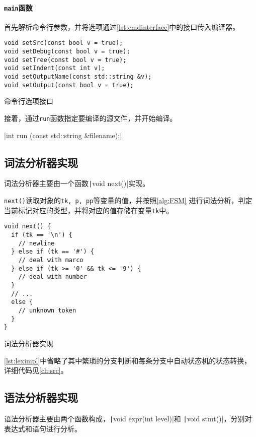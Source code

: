 \paragraph{{\tt main}函数}

首先解析命令行参数，并将选项通过\autoref{lst:cmdinterface}中的接口传入编译器。

\begin{listing}[htb]
\begin{verbatim}
void setSrc(const bool v = true);
void setDebug(const bool v = true);
void setTree(const bool v = true);
void setIndent(const int v);
void setOutputName(const std::string &v);
void setOutput(const bool v = true);
\end{verbatim}
\caption{命令行选项接口}\label{lst:cmdinterface}
\end{listing}

接着，通过{\tt run}函数指定要编译的源文件，并开始编译。

|int run (const std::string &filename);|

\subsection{词法分析器实现}

词法分析器主要由一个函数\texttt|void next()|实现。


{\tt next()}读取对象的{\tt tk, p, pp}等变量的值，并按照\autoref{alg:FSM}
进行词法分析，判定当前标记对应的类型，并将对应的值存储在变量{\tt tk}中。

\begin{listing}[hbt]
\begin{verbatim}
void next() {
  if (tk == '\n') {
    // newline
  } else if (tk == '#') {
    // deal with marco
  } else if (tk >= '0' && tk <= '9') {
    // deal with number
  }
  // ...
  else {
    // unknown token
  }
}
\end{verbatim}
\caption{词法分析器实现}\label{lst:leximpl}
\end{listing}

\autoref{lst:leximpl}中省略了其中繁琐的分支判断和每条分支中自动状态机的状态转换，
详细代码见\autoref{ch:src}。

\subsection{语法分析器实现}

语法分析器主要由两个函数构成，\texttt|void expr(int level)|和
\texttt|void stmt()|，分别对表达式和语句进行分析。

